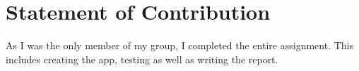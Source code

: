 \section{Statement of Contribution}

As I was the only member of my group, I completed the entire assignment.
This includes creating the app, testing as well as writing the report.
